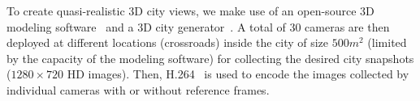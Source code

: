To create quasi-realistic $3$D city views, we make use of an open-source
$3$D modeling software~\cite{Blender} and a $3$D city generator~\cite{Suicidator}.
A total of $30$ cameras are then deployed at different locations (crossroads)
inside the city of size $500 m^2$ (limited by the capacity of the modeling software)
for collecting the desired city snapshots (${1280 \times 720}$ HD images).
Then, H.264~\cite{JMVC} is used to encode the images
collected by individual cameras with or without reference frames.
%
